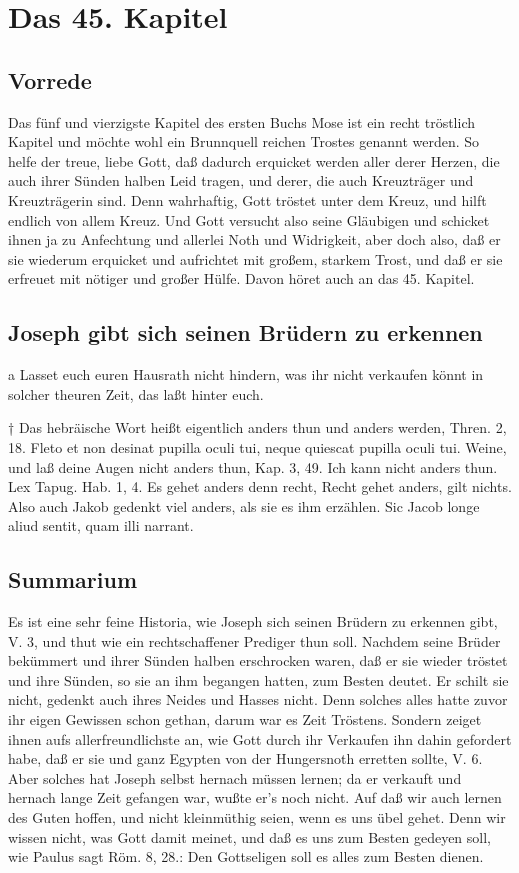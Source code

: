 \chapter{Das 45. Kapitel}

\section{Vorrede}

Das fünf und vierzigste Kapitel des ersten Buchs Mose ist ein recht tröstlich Kapitel und möchte wohl ein Brunnquell reichen Trostes genannt werden. So helfe der treue, liebe Gott, daß dadurch erquicket werden aller derer Herzen, die auch ihrer Sünden halben Leid tragen, und derer, die auch Kreuzträger und Kreuzträgerin sind. Denn wahrhaftig, Gott tröstet unter dem Kreuz, und hilft endlich von allem Kreuz. Und Gott versucht also seine Gläubigen und schicket ihnen ja zu Anfechtung und allerlei Noth und Widrigkeit, aber doch also, daß er sie wiederum erquicket und aufrichtet mit großem, starkem Trost, und daß er sie erfreuet mit nötiger und großer Hülfe. Davon höret auch an das 45. Kapitel.

\section{Joseph gibt sich seinen Brüdern zu erkennen}

a Lasset euch euren Hausrath nicht hindern, was ihr nicht verkaufen könnt in solcher theuren Zeit, das laßt hinter euch.


† Das hebräische Wort heißt eigentlich anders thun und anders werden, Thren. 2, 18. Fleto et non desinat pupilla oculi tui, neque quiescat pupilla oculi tui. Weine, und laß deine Augen nicht anders thun, Kap. 3, 49. Ich kann nicht anders thun. Lex Tapug. Hab. 1, 4. Es gehet anders denn recht, Recht gehet anders, gilt nichts. Also auch Jakob gedenkt viel anders, als sie es ihm erzählen. Sic Jacob longe aliud sentit, quam illi narrant.

\section{Summarium}

Es ist eine sehr feine Historia, wie Joseph sich seinen Brüdern zu erkennen gibt, V. 3, und thut wie ein rechtschaffener Prediger thun soll. Nachdem seine Brüder bekümmert und ihrer Sünden halben erschrocken waren, daß er sie wieder tröstet und ihre Sünden, so sie an ihm begangen hatten, zum Besten deutet. Er schilt sie nicht, gedenkt auch ihres Neides und Hasses nicht. Denn solches alles hatte zuvor ihr eigen Gewissen schon gethan, darum war es Zeit Tröstens. Sondern zeiget ihnen aufs allerfreundlichste an, wie Gott durch ihr Verkaufen ihn dahin gefordert habe, daß er sie und ganz Egypten von der Hungersnoth erretten sollte, V. 6. Aber solches hat Joseph selbst hernach müssen lernen; da er verkauft und hernach lange Zeit gefangen war, wußte er’s noch nicht. Auf daß wir auch lernen des Guten hoffen, und nicht kleinmüthig seien, wenn es uns übel gehet. Denn wir wissen nicht, was Gott damit meinet, und daß es uns zum Besten gedeyen soll, wie Paulus sagt Röm. 8, 28.: Den Gottseligen soll es alles zum Besten dienen.

